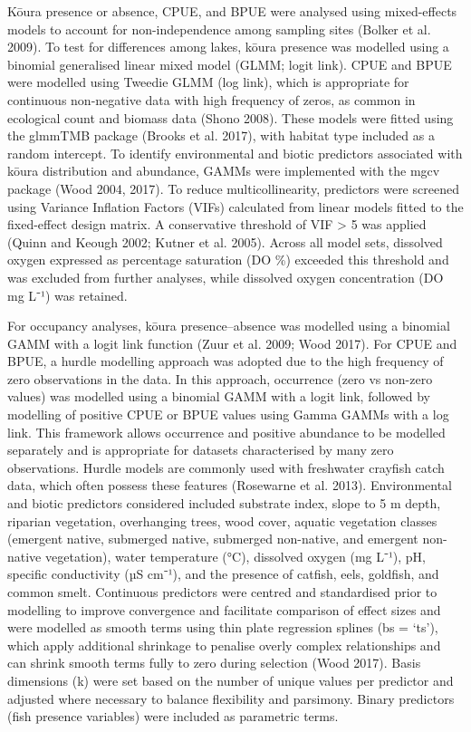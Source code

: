 \documentclass[
  12pt,
  a4paper,
  oneside]{scrbook}
\begin{document}
Kōura presence or absence, CPUE, and BPUE were analysed using
mixed-effects models to account for non-independence among sampling
sites (Bolker et al. 2009). To test for differences among lakes, kōura
presence was modelled using a binomial generalised linear mixed model
(GLMM; logit link). CPUE and BPUE were modelled using Tweedie GLMM (log
link), which is appropriate for continuous non-negative data with high
frequency of zeros, as common in ecological count and biomass data
(Shono 2008). These models were fitted using the glmmTMB package (Brooks
et al. 2017), with habitat type included as a random intercept. To
identify environmental and biotic predictors associated with kōura
distribution and abundance, GAMMs were implemented with the mgcv package
(Wood 2004, 2017). To reduce multicollinearity, predictors were screened
using Variance Inflation Factors (VIFs) calculated from linear models
fitted to the fixed-effect design matrix. A conservative threshold of
VIF \textgreater{} 5 was applied (Quinn and Keough 2002; Kutner et al.
2005). Across all model sets, dissolved oxygen expressed as percentage
saturation (DO \%) exceeded this threshold and was excluded from further
analyses, while dissolved oxygen concentration (DO mg L⁻¹) was retained.

For occupancy analyses, kōura presence--absence was modelled using a
binomial GAMM with a logit link function (Zuur et al. 2009; Wood 2017).
For CPUE and BPUE, a hurdle modelling approach was adopted due to the
high frequency of zero observations in the data. In this approach,
occurrence (zero vs non-zero values) was modelled using a binomial GAMM
with a logit link, followed by modelling of positive CPUE or BPUE values
using Gamma GAMMs with a log link. This framework allows occurrence and
positive abundance to be modelled separately and is appropriate for
datasets characterised by many zero observations. Hurdle models are
commonly used with freshwater crayfish catch data, which often possess
these features (Rosewarne et al. 2013). Environmental and biotic
predictors considered included substrate index, slope to 5 m depth,
riparian vegetation, overhanging trees, wood cover, aquatic vegetation
classes (emergent native, submerged native, submerged non-native, and
emergent non-native vegetation), water temperature (°C), dissolved
oxygen (mg L⁻¹), pH, specific conductivity (µS cm⁻¹), and the presence
of catfish, eels, goldfish, and common smelt. Continuous predictors were
centred and standardised prior to modelling to improve convergence and
facilitate comparison of effect sizes and were modelled as smooth terms
using thin plate regression splines (bs = `ts'), which apply additional
shrinkage to penalise overly complex relationships and can shrink smooth
terms fully to zero during selection (Wood 2017). Basis dimensions (k)
were set based on the number of unique values per predictor and adjusted
where necessary to balance flexibility and parsimony. Binary predictors
(fish presence variables) were included as parametric terms.
\end{document}
